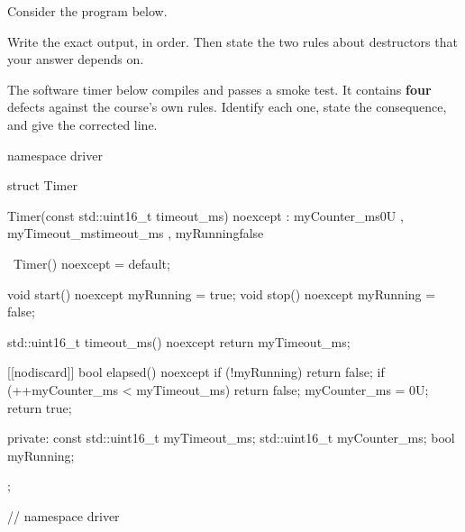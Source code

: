 \label{exa:q:2}

 Consider the program below.


\noindent Write the exact output, in order. Then state the two rules about destructors that your
answer depends on. 

 The software timer below compiles and passes a smoke test. It contains \textbf{four}
defects against the course's own rules. Identify each one, state the consequence, and give the
corrected line. 

\begin{cppcode}
namespace driver
{
struct Timer
{
    Timer(const std::uint16_t timeout_ms) noexcept
        : myCounter_ms{0U}
        , myTimeout_ms{timeout_ms}
        , myRunning{false}
    {}

    ~Timer() noexcept = default;

    void start() noexcept { myRunning = true; }
    void stop() noexcept { myRunning = false; }

    std::uint16_t timeout_ms() noexcept { return myTimeout_ms; }

    [[nodiscard]] bool elapsed() noexcept
    {
        if (!myRunning) { return false; }
        if (++myCounter_ms < myTimeout_ms) { return false; }
        myCounter_ms = 0U;
        return true;
    }

private:
    const std::uint16_t myTimeout_ms;
    std::uint16_t myCounter_ms;
    bool myRunning;
};
} // namespace driver
\end{cppcode}

